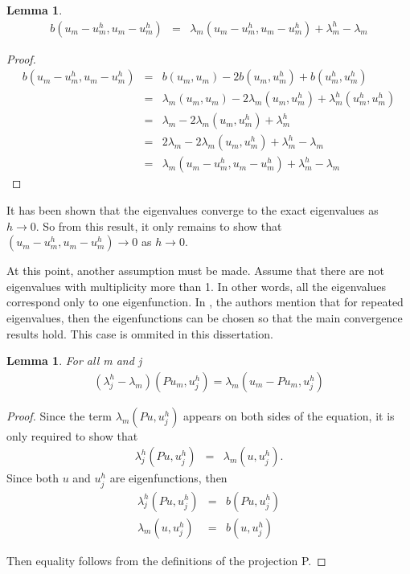 \documentclass[../../main.tex]{subfiles}
\begin{document}
\newtheorem{Lem_5}[Lem_1]{Lemma} \label{Lem_5}
\begin{Lem_5}
	\begin{eqnarray*}
		b(u_{m}-u_{m}^{h},u_{m}-u_{m}^{h}) &=& \lambda_{m}( u_{m}-u_{m}^{h},u_{m}-u_{m}^{h} ) + \lambda_{m}^{h} - \lambda_{m}
		\end{eqnarray*}
\end{Lem_5}
\begin{proof}
	\begin{eqnarray*}
		b(u_{m}-u_{m}^{h},u_{m}-u_{m}^{h}) &=& b(u_{m},u_{m}) - 2b(u_{m},u^{h}_{m}) + b(u^{h}_{m},u^{h}_{m}) \\
										&=& \lambda_{m} ( u_{m}, u_{m} ) - 2\lambda_{m} ( u_{m}, u^{h}_{m} ) + \lambda_{m}^{h}( u_{m}^{h},u_{m}^{h} )\\
										&=&  \lambda_{m} - 2\lambda_{m} ( u_{m}, u^{h}_{m} ) + \lambda_{m}^{h} \\
										&=& 2\lambda_{m} - 2\lambda_{m} ( u_{m}, u^{h}_{m} ) + \lambda_{m}^{h} - \lambda_{m}\\
										&=& \lambda_{m}( u_{m}-u_{m}^{h},u_{m}-u_{m}^{h}) + \lambda_{m}^{h} - \lambda_{m}
		\end{eqnarray*}
\end{proof}

It has been shown that the eigenvalues converge to the exact eigenvalues as $h \rightarrow 0$. So from this result, it only remains to show that $( u_{m}-u_{m}^{h},u_{m}-u_{m}^{h}) \rightarrow 0$ as $h \rightarrow 0$.

At this point, another assumption must be made. Assume that there are not eigenvalues with multiplicity more than 1. In other words, all the eigenvalues correspond only to one eigenfunction. In \cite{SF73}, the authors mention that for repeated eigenvalues, then the eigenfunctions can be chosen so that the main convergence results hold. This case is ommited in this dissertation.

\newtheorem{Lem_6}[Lem_1]{Lemma} \label{Lem_6}
\begin{Lem_6}
	For all m and j
	\begin{eqnarray*}
	(\lambda_{j}^{h} - \lambda_{m}) ( Pu_{m}, u_{j}^{h}) = \lambda_{m} ( u_{m}-Pu_{m},u_{j}^{h} )
	\end{eqnarray*}
\end{Lem_6}
\begin{proof}
	Since the term $\lambda_{m}( Pu,u^{h}_{j})$ appears on both sides of the equation, it is only required to show that
	\begin{eqnarray*}
		\lambda_{j}^{h}( Pu, u_{j}^{h} ) &=& \lambda_{m} ( u, u_{j}^{h} ).	
	\end{eqnarray*}
	Since both $u$ and $u_{j}^{h}$ are eigenfunctions, then
	\begin{eqnarray*}
		\lambda_{j}^{h}( Pu, u_{j}^{h} ) &=& b(Pu,u_{j}^{h})\\
		\lambda_{m} ( u, u_{j}^{h} ) &=& b(u,u_{j}^{h})
	\end{eqnarray*}

	Then equality follows from the definitions of the projection P.
\end{proof}
\end{document}
